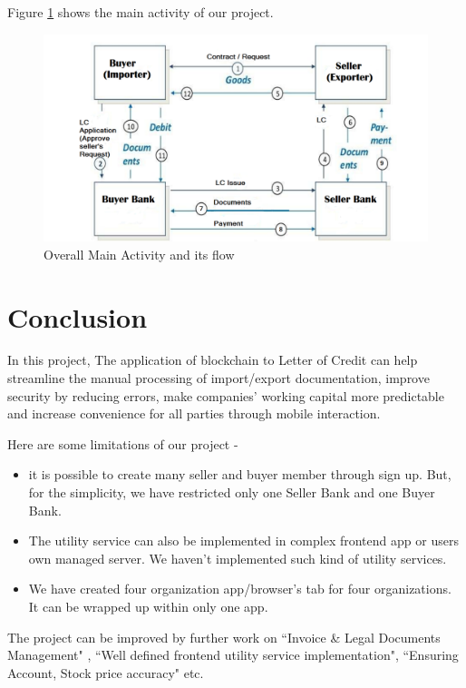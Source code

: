 \documentclass[a4paper,12pt]{report}
\begin{document}
\vspace{20pt}
{\large Figure \ref{fig:analysis} shows the main activity of our project.}
\begin{figure}[h]
    \centering
    \includegraphics[width=1.1\textwidth]{Picture1.pdf}
    \caption{Overall Main Activity and its flow}
    \label{fig:analysis}
\end{figure}

\chapter{Conclusion}

In this project, The application of blockchain to Letter of Credit can help streamline the manual processing of import/export documentation, improve security by reducing errors, make companies' working capital more predictable and increase convenience for all parties through mobile interaction.

\vspace{10pt}
Here are some limitations of our project -
\begin{itemize}
    \item it is possible to create many seller and buyer member through sign up. But, for the simplicity, we have restricted only one Seller Bank and one Buyer Bank.
    
    \item The utility service can also be implemented in complex frontend app or users own  managed server. We haven't implemented such kind of utility services.
    
    \item We have created four organization app/browser's tab for four organizations. It can be wrapped up within only one app.
\end{itemize}


The project can be improved by further work on ``Invoice \& Legal Documents Management" , ``Well defined frontend utility service implementation", ``Ensuring Account, Stock price accuracy" etc.
\renewcommand{\bibname}{References}


\end{document}
